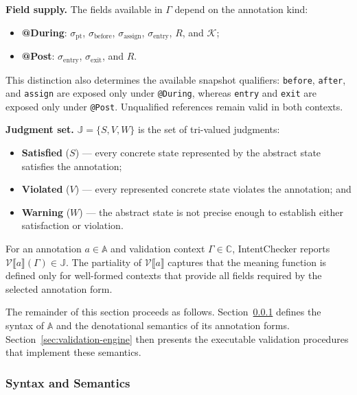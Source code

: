 \documentclass[pdflatex,sn-basic]{sn-jnl}%
\theoremstyle{thmstyleone}%
\theoremstyle{thmstyletwo}%
\theoremstyle{thmstylethree}%
\begin{document}
\smallskip
\noindent\textbf{Field supply.}
The fields available in $\Gamma$ depend on the annotation kind:
\begin{itemize}
\item \textbf{@During}: $\sigma_{\text{pt}}$, $\sigma_{\text{before}}$,
$\sigma_{\text{assign}}$, $\sigma_{\text{entry}}$, $R$, and $\mathcal{K}$;

\item \textbf{@Post}: $\sigma_{\text{entry}}$, $\sigma_{\text{exit}}$, and $R$.
\end{itemize}

This distinction also determines the available snapshot qualifiers:
\texttt{before}, \texttt{after}, and \texttt{assign} are exposed only under
\texttt{@During}, whereas \texttt{entry} and \texttt{exit} are exposed only
under \texttt{@Post}. Unqualified references remain valid in both contexts.

\smallskip
\noindent\textbf{Judgment set.}
$\mathbb{J} = \{S,V,W\}$ is the set of tri-valued judgments:
\begin{itemize}
    \item \textbf{Satisfied} ($S$) --- every concrete state represented by the
    abstract state satisfies the annotation;
    \item \textbf{Violated} ($V$) --- every represented concrete state violates
    the annotation; and
    \item \textbf{Warning} ($W$) --- the abstract state is not precise enough to
    establish either satisfaction or violation.
\end{itemize}

For an annotation $a \in \mathbb{A}$ and validation context
$\Gamma \in \mathbb{C}$,
IntentChecker reports
$\mathcal{V}\llbracket a \rrbracket(\Gamma) \in \mathbb{J}$.
The partiality of
$\mathcal{V}\llbracket a \rrbracket$
captures that the meaning function is defined only for well-formed contexts
that provide all fields required by the selected annotation form.

The remainder of this section proceeds as follows.
Section~\ref{sec:intent-semantics} defines the syntax of $\mathbb{A}$ and the
denotational semantics of its annotation forms.
Section~\ref{sec:validation-engine} then presents the executable validation
procedures that implement these semantics.

\subsubsection{Syntax and Semantics}\label{sec:intent-semantics}
\end{document}
